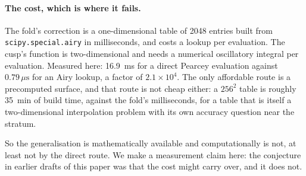 \paragraph{The cost, which is where it fails.}
The fold's correction is a one-dimensional table of \num{2048} entries built from
\texttt{scipy.special.airy} in milliseconds, and costs a lookup per evaluation. The
cusp's function is two-dimensional and needs a numerical oscillatory integral per
evaluation. Measured here: \SI{16.9}{\milli\second} for a direct Pearcey
evaluation against $0.79\,\mu\text{s}$ for an Airy lookup, a factor of
$2.1\times10^{4}$. The only affordable route is a precomputed surface, and that
route is not cheap either: a $256^2$ table is roughly \SI{35}{\minute} of build
time, against the fold's milliseconds, for a table that is itself a
two-dimensional interpolation problem with its own accuracy question near the
stratum.

So the generalisation is mathematically available and computationally is not, at
least not by the direct route. We make a measurement claim here: the
conjecture in earlier drafts of this paper was that the cost might carry over, and
it does not.
